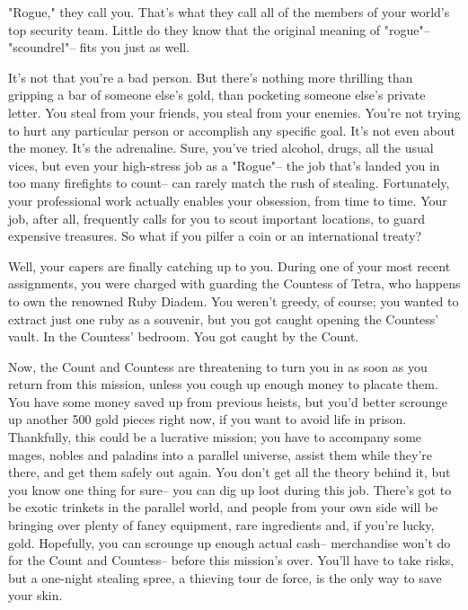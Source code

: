 \documentclass[char]{guildcamp3}
\begin{document}
\name{\cRogueTwo{}}

"Rogue," they call you. That's what they call all of the members of your world's top security team. Little do they know that the original meaning of "rogue"-- "scoundrel"-- fits you just as well. 

It's not that you're a bad person. But there's nothing more thrilling than gripping a bar of someone else's gold, than pocketing someone else's private letter. You steal from your friends, you steal from your enemies. You're not trying to hurt any particular person or accomplish any specific goal. It's not even about the money. It's the adrenaline. Sure, you've tried alcohol, drugs, all the usual vices, but even your high-stress job as a "Rogue"-- the job that's landed you in too many firefights to count-- can rarely match the rush of stealing. Fortunately, your professional work actually enables your obsession, from time to time. Your job, after all, frequently calls for you to scout important locations, to guard expensive treasures. So what if you pilfer a coin or an international treaty?

Well, your capers are finally catching up to you. During one of your most recent assignments, you were charged with guarding the Countess of Tetra, who happens to own the renowned Ruby Diadem. You weren't greedy, of course; you wanted to extract just one ruby as a souvenir, but you got caught opening the Countess' vault. In the Countess' bedroom. You got caught by the Count.

Now, the Count and Countess are threatening to turn you in as soon as you return from this mission, unless you cough up enough money to placate them. You have some money saved up from previous heists, but you'd better scrounge up another 500 gold pieces right now, if you want to avoid life in prison. Thankfully, this could be a lucrative mission; you have to accompany some mages, nobles and paladins into a parallel universe, assist them while they're there, and get them safely out again. You don't get all the theory behind it, but you know one thing for sure-- you can dig up loot during this job. There's got to be exotic trinkets in the parallel world, and people from your own side will be bringing over plenty of fancy equipment, rare ingredients and, if you're lucky, gold. Hopefully, you can scrounge up enough actual cash-- merchandise won't do for the Count and Countess-- before this mission's over. You'll have to take risks, but a one-night stealing spree, a thieving tour de force, is the only way to save your skin.
\end{document}
